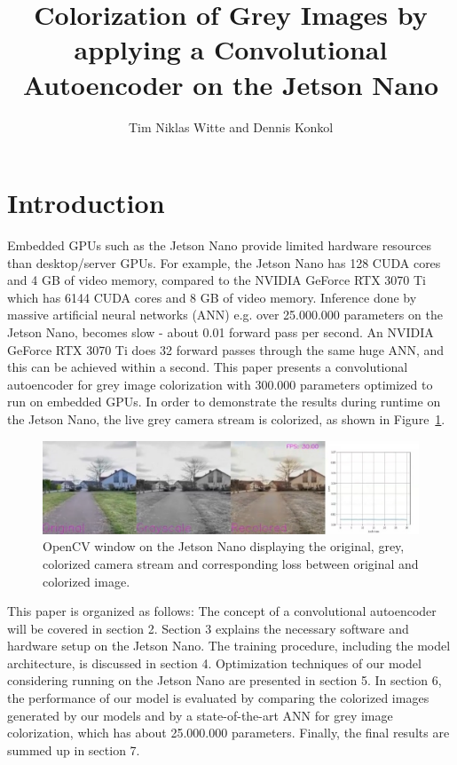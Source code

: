 \documentclass[a4paper,12pt, listof=totoc,toc=sectionentrywithdots]{scrartcl}
\title{Colorization of Grey Images by applying a Convolutional Autoencoder on the Jetson Nano}
\date{}
\author{Tim Niklas Witte and Dennis Konkol}
\begin{document}
\begin{titlingpage}
\maketitle
\end{titlingpage}



\tableofcontents



\cleardoublepage
{}

\section{Introduction}
Embedded GPUs such as the Jetson Nano provide limited hardware resources than desktop/server GPUs.
For example, the Jetson Nano has 128 CUDA cores and 4 GB of video memory, compared to the NVIDIA GeForce RTX 3070 Ti which has 6144 CUDA cores and 8 GB of video memory.
Inference done by massive artificial neural networks (ANN) e.g. over 25.000.000 parameters on the Jetson Nano, becomes slow - about 0.01 forward pass per second.
An NVIDIA GeForce RTX 3070 Ti does 32 forward passes through the same huge ANN, and this can be achieved within a second.
This paper presents a convolutional autoencoder for grey image colorization with 300.000 parameters optimized to run on embedded GPUs.
In order to demonstrate the results during runtime on the Jetson Nano, the live grey camera stream is colorized, as shown in Figure~\ref{fig:OpenCV_window}.  

\begin{figure}[h]
\centering
        \includegraphics[totalheight=4cm]{Figures/OpenCV_window.png}
    \caption{OpenCV window on the Jetson Nano displaying the original, grey, colorized camera stream and corresponding loss between original and colorized image.}
    \label{fig:OpenCV_window}
\end{figure}

This paper is organized as follows:
The concept of a convolutional autoencoder will be covered in section 2.
Section 3 explains the necessary software and hardware setup on the Jetson Nano.
The training procedure, including the model architecture, is discussed in section 4.
Optimization techniques of our model considering running on the Jetson Nano are presented in section 5.
In section 6, the performance of our model is evaluated by comparing the colorized images generated by our models and by a state-of-the-art ANN for grey image colorization, which has about 25.000.000 parameters.
Finally, the final results are summed up in section 7.
\end{document}
